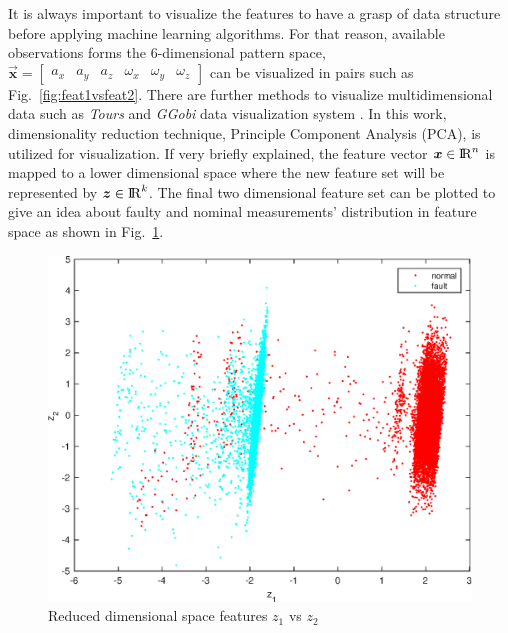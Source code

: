 It is always important to visualize the features to have a grasp of data structure before applying machine learning algorithms. 
For that reason, available observations forms the 6-dimensional pattern space,  $\vec{\bm{x}} = \begin{bmatrix} {a_x} & {a_y} & {a_z} & {\omega_x} & {\omega_y} & {\omega_z}  \end{bmatrix}$ can be visualized in pairs such as Fig.~\ref{fig:feat1vsfeat2}. 
There are further methods to visualize multidimensional data such as \emph{Tours}\cite{asimov1985grand,cook1997manual,cook1995grand} and \emph{GGobi} data visualization system \cite{cook2007interactive}. In this work, dimensionality reduction technique, Principle Component Analysis (PCA), is utilized for visualization. If very briefly explained, the feature vector $\bm{x}\in{\rm I\!R}^{n}$ is mapped to a lower dimensional space where the 
new feature set will be represented by $\bm{z}\in{\rm I\!R}^{k}$. The final two dimensional feature set can be plotted to give an idea about faulty and nominal measurements' distribution in feature space as shown in Fig.~\ref{fig:z1_vs_z2}.

\begin{figure}
\begin{center}
\includegraphics[width=12cm]{figures/reduceDimMeasurements}    %
\caption{Reduced dimensional space features $z_1$ vs $z_2$ } 
\label{fig:z1_vs_z2}
\end{center}
\end{figure}


